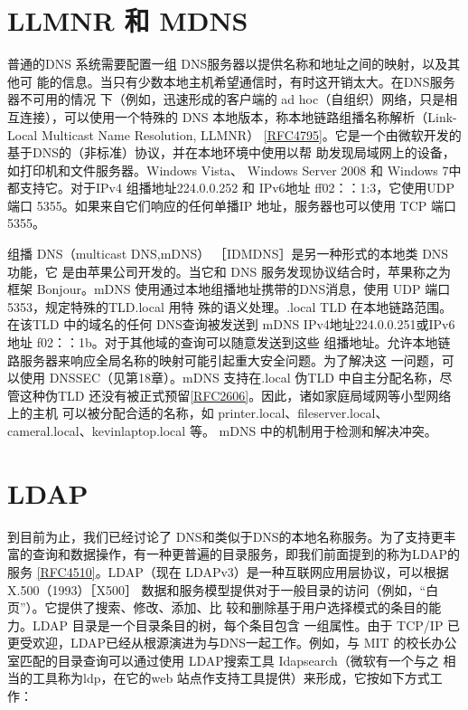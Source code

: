 \section{LLMNR 和 MDNS}

普通的DNS 系统需要配置一组 DNS服务器以提供名称和地址之间的映射，以及其他可
能的信息。当只有少数本地主机希望通信时，有时这开销太大。在DNS服务器不可用的情况
下（例如，迅速形成的客户端的 ad hoc（自组织）网络，只是相互连接），可以使用一个特殊的
DNS 本地版本，称本地链路组播名称解析（Link-Local Multicast Name Resolution, LLMNR）
\href{https://www.rfc-editor.org/rfc/rfc4795}{[RFC4795]}。它是一个由微软开发的基于DNS的（非标准）协议，并在本地环境中使用以帮
助发现局域网上的设备，如打印机和文件服务器。Windows Vista、 Windows Server 2008 和
Windows 7中都支持它。对于IPv4 组播地址224.0.0.252 和 IPv6地址 ff02：：1:3，它使用UDP
端口 5355。如果来自它们响应的任何单播IP 地址，服务器也可以使用 TCP 端口 5355。

组播 DNS（multicast DNS,mDNS） ［IDMDNS］是另一种形式的本地类 DNS 功能，它
是由苹果公司开发的。当它和 DNS 服务发现协议结合时，苹果称之为框架 Bonjour。mDNS
使用通过本地组播地址携带的DNS消息，使用 UDP 端口 5353，规定特殊的TLD.local 用特
殊的语义处理。.local TLD 在本地链路范围。在该TLD 中的域名的任何 DNS查询被发送到
mDNS IPv4地址224.0.0.251或IPv6地址 f02：：1b。对于其他域的查询可以随意发送到这些
组播地址。允许本地链路服务器来响应全局名称的映射可能引起重大安全问题。为了解决这
一问题，可以使用 DNSSEC（见第18章）。mDNS 支持在.local 伪TLD 中自主分配名称，尽
管这种伪TLD 还没有被正式预留\href{https://www.rfc-editor.org/rfc/rfc2606}{[RFC2606]}。因此，诸如家庭局域网等小型网络上的主机
可以被分配合适的名称，如 printer.local、fileserver.local、cameral.local、kevinlaptop.local 等。
mDNS 中的机制用于检测和解决冲突。

\section{LDAP}

到目前为止，我们已经讨论了 DNS和类似于DNS的本地名称服务。为了支持更丰
富的查询和数据操作，有一种更普遍的目录服务，即我们前面提到的称为LDAP的服务
\href{https://www.rfc-editor.org/rfc/rfc4510}{[RFC4510]}。LDAP（现在 LDAPv3）是一种互联网应用层协议，可以根据 X.500（1993）［X500］
数据和服务模型提供对于一般目录的访问（例如，“白页”）。它提供了搜索、修改、添加、比
较和删除基于用户选择模式的条目的能力。LDAP 目录是一个目录条目的树，每个条目包含
一组属性。由于 TCP/IP 已更受欢迎，LDAP已经从根源演进为与DNS一起工作。例如，与
MIT 的校长办公室匹配的目录查询可以通过使用 LDAP搜索工具 Idapsearch（微软有一个与之
相当的工具称为ldp，在它的web 站点作支持工具提供）来形成，它按如下方式工作：

